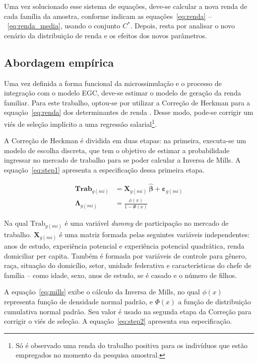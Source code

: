 Uma vez solucionado esse sistema de equações, deve-se calcular a nova renda de cada família da amostra, conforme indicam as equações~\eqref{eq:renda} --~\eqref{eq:renda_media}, usando o conjunto $C^*$. Depois, resta por analisar o novo cenário da distribuição de renda e os efeitos dos novos parâmetros.


\subsection{Abordagem empírica} \label{subsec:abordagem_empirica}

Uma vez definida a forma funcional da microssimulação e o processo de integração com o modelo EGC, deve-se estimar o modelo de geração da renda familiar. Para este trabalho, optou-se por utilizar a Correção de Heckman para a equação~\eqref{eq:renda} dos determinantes de renda \cite{heckman79}. Desse modo, pode-se corrigir um viés de seleção implícito a uma regressão salarial\footnote{Só é observado uma renda do trabalho positiva para os indivíduos que estão empregados no momento da pesquisa amostral.}.

A Correção de Heckman é dividida em duas etapas: na primeira, executa-se um modelo de escolha discreta, que tem o objetivo de estimar a probabilidade ingressar no mercado de trabalho para se poder calcular a Inversa de Mills. A equação~\eqref{eq:step1} apresenta a especificação dessa primeira etapa.

\begin{align}
	\textbf{Trab}_{g(mi)}        &= \mathbf{X}_{g(mi)} \ \boldsymbol{\hat{\beta}} + \boldsymbol{\varepsilon}_{g(mi)} \label{eq:step1} \\
	\boldsymbol{\Lambda}_{g(mi)} &= \frac{\phi(x)}{1 - \Phi(x)} \label{eq:mills}
\end{align}

Na qual $\text{Trab}_{g(mi)}$ é uma variável \textit{dummy} de participação no mercado de trabalho. $\mathbf{X}_{g(mi)}$ é uma matriz formada pelas seguintes variáveis independentes: anos de estudo, experiência potencial e experiência potencial quadrática, renda domiciliar per capita. Também é formada por variáveis de controle para gênero, raça, situação do domicílio, setor, unidade federativa e características do chefe de família -- como idade, sexo, anos de estudo, se é casado e o número de filhos.

A equação~\eqref{eq:mills} exibe o cálculo da Inversa de Mills, no qual $\phi(x)$ representa função de densidade normal padrão, e $\Phi(x)$ a função de distribuição cumulativa normal padrão. Seu valor é usado na segunda etapa da Correção para corrigir o viés de seleção. A equação~\eqref{eq:step2} apresenta sua especificação.

